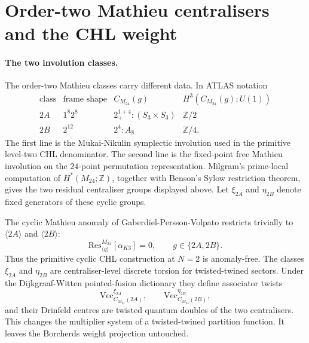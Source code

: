 \providecommand{\Mtf}{M_{24}}
\providecommand{\cent}{C_{\Mtf}}
\providecommand{\Res}{\mathrm{Res}}
\providecommand{\Bor}{\operatorname{Bor}}
\providecommand{\wt}{\operatorname{wt}}
\providecommand{\cO}{\mathcal O}
\providecommand{\fg}{\mathfrak g}
\providecommand{\ZZ}{\mathbb Z}
\providecommand{\kBKM}{\kappa_{\mathrm{BKM}}}
\providecommand{\kch}{\kappa_{\mathrm{ch}}}
\providecommand{\kcat}{\kappa_{\mathrm{cat}}}
\providecommand{\kfib}{\kappa_{\mathrm{fiber}}}
\providecommand{\kHeis}{\kappa_{\mathrm{ch}}^{\mathrm{Heis}}}

\section*{Order-two Mathieu centralisers and the CHL weight}
\label{note:sec:n2-2a-2b-anomalies}

\paragraph{The two involution classes.}
The order-two Mathieu classes carry different data.  In ATLAS notation
\[
\begin{array}{c|c|c|c}
\text{class} & \text{frame shape} & \cent(g) &
H^3(\cent(g);U(1))\\
\hline
2A & 1^8 2^8 & 2^{1+4}_{+}{:}(S_3\times S_3) & \ZZ/2\\
2B & 2^{12} & 2^4{:}A_8 & \ZZ/4 .
\end{array}
\]
The first line is the Mukai-Nikulin symplectic involution used in the
primitive level-two CHL denominator.  The second line is the fixed-point
free Mathieu involution on the \(24\)-point permutation representation.
Milgram's prime-local computation of \(H^\ast(M_{24};\ZZ)\), together
with Benson's Sylow restriction theorem, gives the two residual
centraliser groups displayed above.  Let
\(\xi_{2A}\) and \(\eta_{2B}\) denote fixed generators of these cyclic
groups.

The cyclic Mathieu anomaly of Gaberdiel-Persson-Volpato restricts
trivially to \(\langle 2A\rangle\) and \(\langle 2B\rangle\):
\[
 \Res^{M_{24}}_{\langle g\rangle}[\alpha_{K3}]=0,\qquad
 g\in\{2A,2B\}.
\]
Thus the primitive cyclic CHL construction at \(N=2\) is anomaly-free.
The classes \(\xi_{2A}\) and \(\eta_{2B}\) are centraliser-level
discrete torsion for twisted-twined sectors.  Under the
Dijkgraaf-Witten pointed-fusion dictionary they define associator twists
\[
 \mathrm{Vec}_{\cent(2A)}^{\xi_{2A}},\qquad
 \mathrm{Vec}_{\cent(2B)}^{\eta_{2B}},
\]
and their Drinfeld centres are twisted quantum doubles of the two
centralisers.  This changes the multiplier system of a twisted-twined
partition function.  It leaves the Borcherds weight projection untouched.

